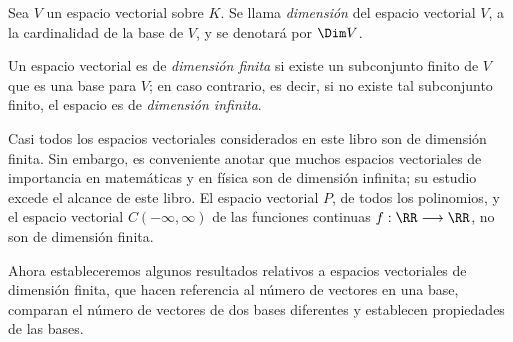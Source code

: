 \begin{definicion}{}{}
    Sea $V$ un espacio vectorial sobre $K$. Se llama \emph{dimensión} del espacio vectorial $V$, a la cardinalidad de la base de $V$, y se denotará por $\Dim V$.
\end{definicion}

Un espacio vectorial es de \emph{dimensión finita} si existe un subconjunto finito de $V$ que es una base para $V$; en caso contrario, es decir, si no existe tal subconjunto finito, el espacio es de \emph{dimensión infinita}.

Casi todos los espacios vectoriales considerados en este libro son de dimensión finita. Sin embargo, es conveniente anotar que muchos espacios vectoriales de importancia en matemáticas y en física son de dimensión infinita; su estudio excede el alcance de este libro. El espacio vectorial $P$, de todos los polinomios, y el espacio vectorial $C(-\infty, \infty)$ de las funciones continuas $f: \RR \longrightarrow \RR$, no son de dimensión finita.

Ahora estableceremos algunos resultados relativos a espacios vectoriales de dimensión finita, que hacen referencia al número de vectores en una base, comparan el número de vectores de dos bases diferentes y establecen propiedades de las bases.

